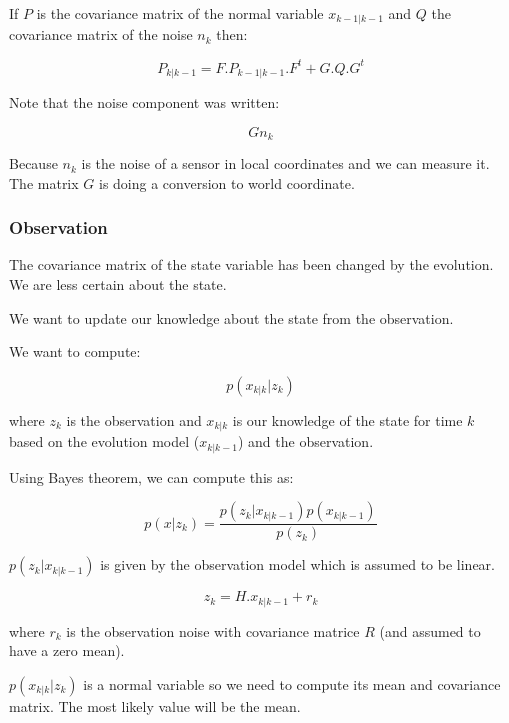 \documentclass[titlepage,a4,12pt]{article}
\numberwithin{equation}{subsection}
\newcommand{\curr}[1]{#1_{k-1|k-1}}
\newcommand{\before}[1]{#1_{k|k-1}}
\newcommand{\after}[1]{#1_{k|k}}
\begin{document}
If $P$ is the covariance matrix of the normal variable $\curr{x}$ and $Q$ the covariance matrix of the noise $n_k$ then:

\begin{equation} \label{eq:covariance}
\before{P} = F . \curr{P} . F^t + G . Q . G^t
\end{equation}

Note that the noise component was written:

\begin{equation} \label{eq:noisecomponent}
G n_{k}
\end{equation}

Because $n_{k}$ is the noise of a sensor in local coordinates and we can measure it.
The matrix $G$ is doing a conversion to world coordinate.


\subsubsection{Observation}

The covariance matrix of the state variable has been changed by the evolution. We are less certain about the state.

We want to update our knowledge about the state from the observation.

We want to compute:

\begin{equation} 
p(\after{x} | z_k)
\end{equation}

where $z_k$ is the observation and $\after{x}$ is our knowledge of the state for time $k$ based on the evolution model ($\before{x}$) and the observation.

Using Bayes theorem, we can compute this as:

\begin{equation} 
p(x | z_k) = \frac{p(z_k | \before{x}) p(\before{x})}{p(z_k)}
\end{equation}


$p(z_k | \before{x})$ is given by the observation model which is assumed to be linear.

\begin{equation} 
z_k = H . \before{x} + r_k
\end{equation}

where $r_k$ is the observation noise with covariance matrice $R$ (and assumed to have a zero mean).

$p(\after{x} | z_k)$ is a normal variable so we need to compute its mean and covariance matrix. The most likely value will be the mean.
\end{document}
